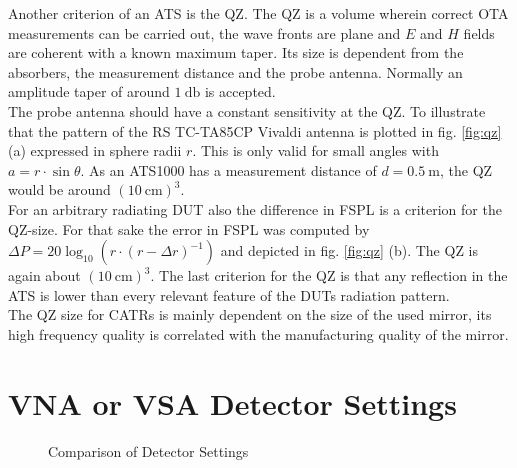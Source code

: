 Another criterion of an \ac{ATS} is the \ac{QZ}. The \ac{QZ} is a volume wherein correct \ac{OTA} measurements can be carried out, the wave fronts are plane and $E$ and $H$ fields are coherent with a known maximum taper. Its size is dependent from the absorbers, the measurement distance and the probe antenna. Normally an amplitude taper of around $\SI{1}{\decibel}$ is accepted.\\
The probe antenna should have a constant sensitivity at the \ac{QZ}. To illustrate that the pattern of the \ac{RS} TC-TA85CP Vivaldi antenna is plotted in fig. \ref{fig:qz} (a) expressed in sphere radii $r$. This is only valid for small angles with $a=r\cdot\sin \theta$. As an ATS1000 has a measurement distance of $d = \SI{0.5}{\meter}$, the \ac{QZ} would be around $\left(\SI{10}{\centi\meter}\right)^3$.\\
For an arbitrary radiating \ac{DUT} also the difference in \ac{FSPL} is a criterion for the \ac{QZ}-size. For that sake the error in \ac{FSPL} was computed by $\Delta P = 20\log_{10}\left(r\cdot\left(r-\Delta r\right)^{-1}\right)$ and depicted in fig. \ref{fig:qz} (b). The \ac{QZ} is again about $\left(\SI{10}{\centi\meter}\right)^3$. The last criterion for the \ac{QZ} is that any reflection in the \ac{ATS} is lower than every relevant feature of the \ac{DUT}s radiation pattern.\cite{ach}\\
The \ac{QZ} size for \acp{CATR} is mainly dependent on the size of the used mirror, its high frequency quality is correlated with the manufacturing quality of the mirror.

\section{VNA or VSA Detector Settings}

\begin{figure}[h]
\centering
\def\svgwidth{0.7\textwidth}

\caption{Comparison of Detector Settings \cite{funsspec}}
\label{fig:detset}
\end{figure}

